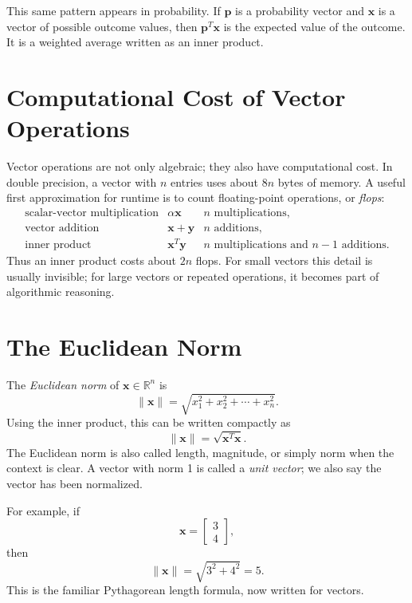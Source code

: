 This same pattern appears in probability. If \(\mathbf{p}\) is a probability vector and \(\mathbf{x}\) is a vector of possible outcome values, then \(\mathbf{p}^T\mathbf{x}\) is the expected value of the outcome. It is a weighted average written as an inner product.


\section{Computational Cost of Vector Operations}
\label{mf:vector-computation-complexity}
\label{mf:floating-point-storage}

Vector operations are not only algebraic; they also have computational cost. In double precision, a vector with \(n\) entries uses about \(8n\) bytes of memory. A useful first approximation for runtime is to count floating-point operations, or \emph{flops}:
\[
\begin{array}{lll}
\text{scalar-vector multiplication} & \alpha\mathbf{x} & n\text{ multiplications},\\
\text{vector addition} & \mathbf{x}+\mathbf{y} & n\text{ additions},\\
\text{inner product} & \mathbf{x}^T\mathbf{y} & n\text{ multiplications and }n-1\text{ additions}.
\end{array}
\]
Thus an inner product costs about \(2n\) flops. For small vectors this detail is usually invisible; for large vectors or repeated operations, it becomes part of algorithmic reasoning.

\section{The Euclidean Norm}
\label{mf:norms-euclidean}

The \emph{Euclidean norm} of \(\mathbf{x}\in\mathbb{R}^n\) is
\[
    \|\mathbf{x}\|=\sqrt{x_1^2+x_2^2+\cdots+x_n^2}.
\]
Using the inner product, this can be written compactly as
\[
    \|\mathbf{x}\|=\sqrt{\mathbf{x}^T\mathbf{x}}.
\]
The Euclidean norm is also called length, magnitude, or simply norm when the context is clear. A vector with norm 1 is called a \emph{unit vector}; we also say the vector has been normalized.
\label{mf:unit-vector}

For example, if
\[
    \mathbf{x}=\begin{bmatrix}3\\4\end{bmatrix},
\]
then
\[
    \|\mathbf{x}\|=\sqrt{3^2+4^2}=5.
\]
This is the familiar Pythagorean length formula, now written for vectors.

